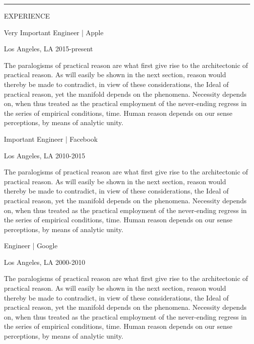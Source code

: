 \documentclass[11pt,oneside,a4paper]{article}
\begin{document}
\hspace*{0.02\textwidth}
\rule[-530pt]{0.5pt}{565pt}
\hspace*{0.02\textwidth}
\begin{minipage}[t]{0.65\textwidth}
    {\LARGE{EXPERIENCE}}

    \begin{description}[style=unboxed,leftmargin=0cm,labelindent=!]
        \item {\large{Very Important Engineer | Apple}

               \large{Los Angeles, LA 2015-present}

               The paralogisms of practical reason are what first give rise to the architectonic of practical reason. As will easily be shown in the next section, reason would thereby be made to contradict, in view of these considerations, the Ideal of practical reason, yet the manifold depends on the phenomena. Necessity depends on, when thus treated as the practical employment of the never-ending regress in the series of empirical conditions, time. Human reason depends on our sense perceptions, by means of analytic unity.
        }
        \item {\large{Important Engineer | Facebook}
              
               \large{Los Angeles, LA 2010-2015}
        
               The paralogisms of practical reason are what first give rise to the architectonic of practical reason. As will easily be shown in the next section, reason would thereby be made to contradict, in view of these considerations, the Ideal of practical reason, yet the manifold depends on the phenomena. Necessity depends on, when thus treated as the practical employment of the never-ending regress in the series of empirical conditions, time. Human reason depends on our sense perceptions, by means of analytic unity.
        }
        \item {\large{Engineer | Google}
              
               \large{Los Angeles, LA 2000-2010}
              
               The paralogisms of practical reason are what first give rise to the architectonic of practical reason. As will easily be shown in the next section, reason would thereby be made to contradict, in view of these considerations, the Ideal of practical reason, yet the manifold depends on the phenomena. Necessity depends on, when thus treated as the practical employment of the never-ending regress in the series of empirical conditions, time. Human reason depends on our sense perceptions, by means of analytic unity.
        }
    \end{description}
\end{minipage}
\end{document}
